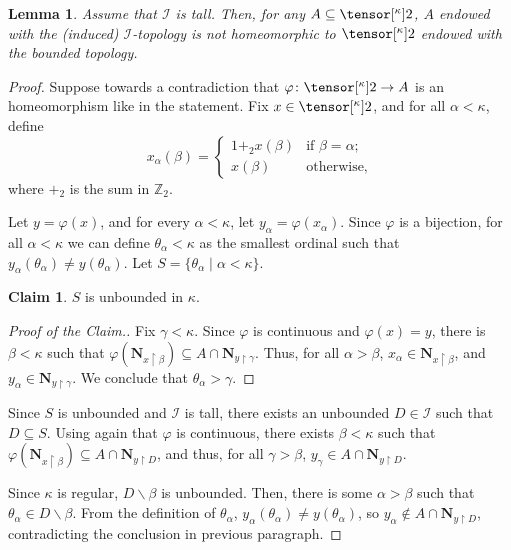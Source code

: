 \documentclass{amsart}
\numberwithin{equation}{section}
\newcommand{\I}{\mathcal{I}}
\newcommand{\pre}[2]{\tensor[^{#1}]{#2}{}}
\newcommand{\Nbhd}{\boldsymbol{N}}
\newcommand{\1}{\mathbf{I}}
\newcommand{\2}{\mathbf{II}}
\renewcommand{\b}{\beta}
\newcommand{\g}{\gamma}
\renewcommand{\k}{\kappa}
\newcommand{\clopen}[1]{\Nbhd_{#1}}
\newtheorem{lemma}[theorem]{Lemma}
\theoremstyle{definition}
\newtheorem{claim}{Claim}[theorem]
\theoremstyle{remark}
\begin{document}
\begin{lemma}\label{lemma:tall_and_homeo2}
 Assume that $\I$ is tall. Then,  for any $A\subseteq\pre{\k}{2}$, \(A\) endowed with the (induced) \(\I\)-topology is not homeomorphic to $\pre{\k}{2}$ endowed with the bounded topology.
\end{lemma}
\begin{proof}
    Suppose towards a contradiction that $\varphi\colon \pre{\k}{2}\to A $ is  an homeomorphism like in the statement. Fix $x\in\pre{\k}{2}$, and for all $\alpha<\kappa$, define 
    $$x_\alpha(\beta)=\begin{cases} 1+_2 x(\beta) &\mbox{if }\beta=\alpha;\\
    x(\beta) & 
    \text{otherwise,}\end{cases}$$ 
    where $+_2$ is the sum in $\mathbb{Z}_2$.

    Let  $y=\varphi(x)$, and for every $\alpha<\kappa$, let $y_\alpha=\varphi(x_\alpha)$. Since $\varphi$ is a bijection, for all $\alpha<\kappa$ we can define $\theta_\alpha<\kappa$ as the smallest ordinal such that $y_\alpha(\theta_\alpha)\neq y(\theta_\alpha)$. Let $S=\{\theta_\alpha\mid \alpha<\kappa\}$.
    \begin{claim}
        $S$ is unbounded in \(\k\).
    \end{claim}
    \begin{proof}[Proof of the Claim.]
        Fix $\gamma<\kappa$. %
        Since $\varphi$ is continuous and $\varphi(x)=y$, there is $\beta<\kappa$ such that $\varphi(\clopen{x\restriction \beta})\subseteq A \cap \clopen{y\restriction\gamma} $. Thus, for all $\alpha>\beta$, $x_\alpha\in \clopen{x\restriction\beta}$, and $y_\alpha\in \clopen{y\restriction\gamma}$. We conclude that $\theta_\alpha>\gamma$.
    \end{proof}
    Since $S$ is unbounded and $\I$ is tall, there exists an  unbounded $D\in \I$ such that $D\subseteq S$. Using again that $\varphi$ is continuous, there exists $\b<\kappa$ such that $\varphi(\clopen{x\restriction \b})\subseteq A \cap \clopen{y\restriction D} $, and thus, for all $\g>\beta$, $y_\g\in A\cap \clopen{y\restriction D}$. 

    Since $\kappa$ is regular, $D\backslash \beta$ is unbounded. Then, there is some $\alpha>\beta$ such that  $\theta_\alpha\in D\backslash \beta$. From the definition of $\theta_\alpha$, $y_\alpha(\theta_\alpha)\neq y(\theta_\alpha)$, so $y_\alpha\notin A\cap \clopen{y\restriction D}$, contradicting the conclusion in previous paragraph.
\end{proof}
\end{document}
